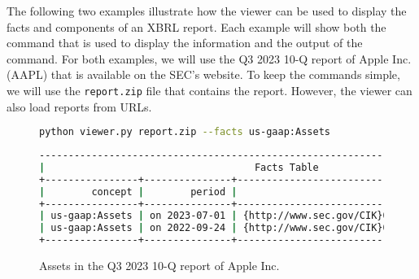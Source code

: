 


The following two examples illustrate how the viewer can be used to display the facts and components of an XBRL report.
Each example will show both the command that is used to display the information and the output of the command.
For both examples, we will use the Q3 2023 10-Q report of Apple Inc. (AAPL) that is available on the SEC's website\cite{aapl_10q_2023_q3}.
To keep the commands simple, we will use the \texttt{report.zip} file that contains the report.
However, the viewer can also load reports from URLs.

\begin{figure}[H]
    \centering
    \caption{Assets in the Q3 2023 10-Q report of Apple Inc.}
    \begin{lstlisting}[language=bash]
python viewer.py report.zip --facts us-gaap:Assets
\end{lstlisting}
    \begin{lstlisting}[language=bash, basicstyle=\scriptsize\ttfamily]
--------------------------------------------------------------------------------------------+
|                                    Facts Table                                            |
+----------------+---------------+------------------------------------+------+--------------+
|        concept |        period |                             entity | unit |        value |
+----------------+---------------+------------------------------------+------+--------------+
| us-gaap:Assets | on 2023-07-01 | {http://www.sec.gov/CIK}0000320193 |  usd | 335038000000 |
| us-gaap:Assets | on 2022-09-24 | {http://www.sec.gov/CIK}0000320193 |  usd | 352755000000 |
+----------------+---------------+------------------------------------+------+--------------+
\end{lstlisting}
    \label{fig:aapl_assets}
\end{figure}

